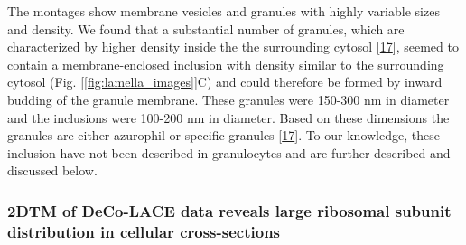 \documentclass[
]{article}
\begin{document}
The montages show membrane vesicles and granules with highly variable sizes and
density. We found that a substantial number of granules, which are characterized by higher
density inside the the surrounding cytosol {[}\protect\hyperlink{ref-xE2EhAcH}{17}{]}, seemed to contain a membrane-enclosed inclusion with density similar to
the surrounding cytosol (Fig. {[}\ref{fig:lamella_images}{]}C) and could therefore be formed
by inward budding of the granule membrane. These granules were
150-300 nm in diameter and the inclusions were 100-200 nm in diameter. Based on
these dimensions the granules are either azurophil or specific granules {[}\protect\hyperlink{ref-xE2EhAcH}{17}{]}. To our
knowledge, these inclusion have not been described in granulocytes and are
further described and discussed below.

\hypertarget{dtm-of-deco-lace-data-reveals-large-ribosomal-subunit-distribution-in-cellular-cross-sections}{%
\subsubsection{2DTM of DeCo-LACE data reveals large ribosomal subunit distribution in cellular cross-sections}\label{dtm-of-deco-lace-data-reveals-large-ribosomal-subunit-distribution-in-cellular-cross-sections}}
\end{document}
